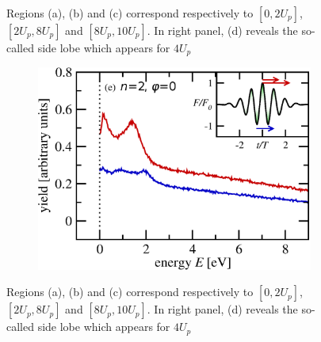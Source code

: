\documentclass[a4paper]{article}
\begin{document}
\begin{figure}
\begin{subfigure} [t]{0.5\textwidth}
 \resizebox{1\textwidth}{!}{}
 \label{myATI} 
\end{subfigure}
\begin{subfigure} [t]{0.5\textwidth}
\hspace{-1.5cm}
 \resizebox{1.6\textwidth}{!}{}
 \label{myPAD} 
\end{subfigure}
 \caption{Regions (a), (b) and (c) correspond respectively to $[0, 2U_{p}]$, $[2U_{p}, 8U_{p}]$ and $[8U_{p}, 10U_{p}]$. In right panel, (d) reveals the so-called side lobe which appears for $4U_{p}$}
\end{figure}

\begin{figure}
\begin{subfigure} [t]{0.5\textwidth}
\hspace{-1cm}
 \includegraphics[width=1.2\textwidth]{data/kastner.eps}
 \label{myPAD} 
\end{subfigure}
\begin{subfigure} [t]{0.5\textwidth}
\hspace{-0.5cm}
 \resizebox{0.983\textwidth}{!}{}
 \label{myATI} 
\end{subfigure}
 \caption{Regions (a), (b) and (c) correspond respectively to $[0, 2U_{p}]$, $[2U_{p}, 8U_{p}]$ and $[8U_{p}, 10U_{p}]$. In right panel, (d) reveals the so-called side lobe which appears for $4U_{p}$}
\end{figure}



\end{document}
